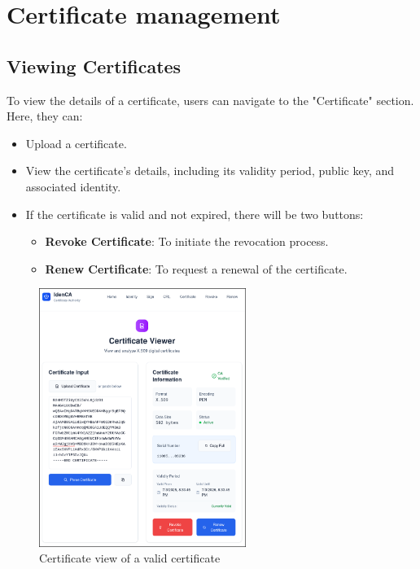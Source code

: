 \section{Certificate management}
\subsection{Viewing Certificates}
To view the details of a certificate, users can navigate to the "Certificate" section. Here, they can:
\begin{itemize}
    \item Upload a certificate.
    \item View the certificate's details, including its validity period, public key, and associated identity.
    \item If the certificate is valid and not expired, there will be two buttons:
        \begin{itemize}
            \item \textbf{Revoke Certificate}: To initiate the revocation process.
            \item \textbf{Renew Certificate}: To request a renewal of the certificate.
        \end{itemize}
\end{itemize}
\begin{figure}[h!]
    \centering
    \includegraphics[keepaspectratio, width=0.6\textwidth]{Pic/5_certificate_view.png}
    \caption{Certificate view of a valid certificate}
    \label{fig:certificate-view-1}
\end{figure}

